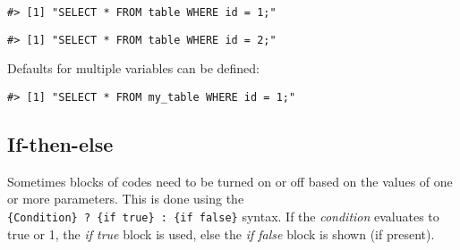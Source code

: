 \documentclass[]{article}
\newenvironment{Shaded}{\begin{snugshade}}{\end{snugshade}}
\newcommand{\DataTypeTok}[1]{\textcolor[rgb]{0.13,0.29,0.53}{#1}}
\newcommand{\DecValTok}[1]{\textcolor[rgb]{0.00,0.00,0.81}{#1}}
\newcommand{\KeywordTok}[1]{\textcolor[rgb]{0.13,0.29,0.53}{\textbf{#1}}}
\newcommand{\NormalTok}[1]{#1}
\newcommand{\OperatorTok}[1]{\textcolor[rgb]{0.81,0.36,0.00}{\textbf{#1}}}
\newcommand{\OtherTok}[1]{\textcolor[rgb]{0.56,0.35,0.01}{#1}}
\newcommand{\StringTok}[1]{\textcolor[rgb]{0.31,0.60,0.02}{#1}}
\begin{document}
\begin{verbatim}
#> [1] "SELECT * FROM table WHERE id = 1;"
\end{verbatim}

\begin{Shaded}
\end{Shaded}

\begin{verbatim}
#> [1] "SELECT * FROM table WHERE id = 2;"
\end{verbatim}

Defaults for multiple variables can be defined:

\begin{Shaded}
\end{Shaded}

\begin{verbatim}
#> [1] "SELECT * FROM my_table WHERE id = 1;"
\end{verbatim}

\hypertarget{if-then-else}{%
\subsection{If-then-else}\label{if-then-else}}

Sometimes blocks of codes need to be turned on or off based on the
values of one or more parameters. This is done using the
\texttt{\{Condition\}\ ?\ \{if\ true\}\ :\ \{if\ false\}} syntax. If the
\emph{condition} evaluates to true or 1, the \emph{if true} block is
used, else the \emph{if false} block is shown (if present).

\begin{Shaded}
\end{Shaded}
\end{document}
